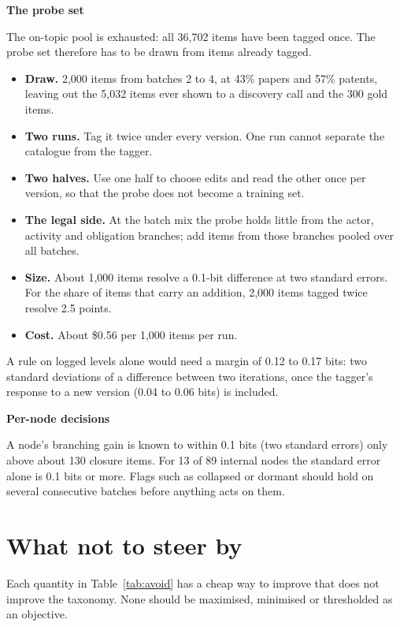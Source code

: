 \documentclass[10pt,a4paper]{article}
\newcommand{\lab}[1]{\par\vspace{0.35em}\textbf{#1}\par\nobreak}
\begin{document}
\lab{The probe set}
The on-topic pool is exhausted: all 36,702 items have been tagged once. The probe set therefore has to be
drawn from items already tagged.
\begin{itemize}
\item \textbf{Draw.} 2,000 items from batches 2 to 4, at 43\% papers and 57\% patents, leaving out the 5,032 items ever shown to a discovery call and the 300 gold items.
\item \textbf{Two runs.} Tag it twice under every version. One run cannot separate the catalogue from the tagger.
\item \textbf{Two halves.} Use one half to choose edits and read the other once per version, so that the probe does not become a training set.
\item \textbf{The legal side.} At the batch mix the probe holds little from the actor, activity and obligation branches; add items from those branches pooled over all batches.
\item \textbf{Size.} About 1,000 items resolve a 0.1-bit difference at two standard errors. For the share of items that carry an addition, 2,000 items tagged twice resolve 2.5 points.
\item \textbf{Cost.} About \$0.56 per 1,000 items per run.
\end{itemize}
A rule on logged levels alone would need a margin of 0.12 to 0.17 bits: two standard deviations of a
difference between two iterations, once the tagger's response to a new version (0.04 to 0.06 bits) is
included.

\lab{Per-node decisions}
A node's branching gain is known to within 0.1 bits (two standard errors) only above about 130 closure items.
For 13 of 89 internal nodes the standard error alone is 0.1 bits or more. Flags such as collapsed or dormant
should hold on several consecutive batches before anything acts on them.

\section{What not to steer by}

Each quantity in Table~\ref{tab:avoid} has a cheap way to improve that does not improve the taxonomy. None
should be maximised, minimised or thresholded as an objective.
\end{document}
